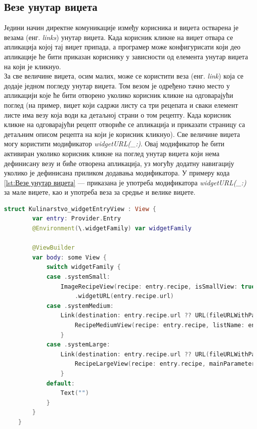 \documentclass[12pt,oneside]{memoir}
\begin{document}
\subsection{Везе унутар виџета}
\indent Једини начин директне комуникације између корисника и виџета остварена је везама (енг. \textit{links}) унутар виџета. Када корисник кликне на виџет отвара се апликација којој тај виџет припада, а програмер може конфигурисати који део апликације ће бити приказан кориснику у зависности од елемента унутар виџета на који је кликнуо.
\\
\indent За све величине виџета, осим малих, може се користити веза (енг. \textit{link}) која се додаје једном погледу унутар виџета. Том везом је одређено тачно место у апликацији које ће бити отворено уколико корисник кликне на одговарајући поглед (на пример, виџет који садржи листу са три рецепата и сваки елемент листе има везу која води ка детаљној страни о том рецепту. Када корисник кликне на одговарајући рецепт отвориће се апликација и приказати страницу са детаљним описом рецепта на који је корисник кликнуо). Све величине виџета могу користити модификатор \textit{widgetURL(\_:)}. Овај модификатор ће бити активиран уколико корисник кликне на поглед унутар виџета који нема дефинисану везу и биће отворена апликација, уз могућу додатну навигацију уколико је дефинисана приликом додавања модификатора. У примеру кода \ref{lst:Везе унутар виџета} ---  приказана је употреба модификатора \textit{widgetURL(\_:)} за мале виџете, као и употреба веза за средње и велике виџете.

\begin{lstlisting}[caption=\textit{{Везе унутар виџета}}, label={lst:Везе унутар виџета}, language=Swift, frame=single]
    struct Kulinarstvo_widgetEntryView : View {
        var entry: Provider.Entry
        @Environment(\.widgetFamily) var widgetFamily
        
        @ViewBuilder
        var body: some View {
            switch widgetFamily {
            case .systemSmall:
                ImageRecipeView(recipe: entry.recipe, isSmallView: true)
                    .widgetURL(entry.recipe.url)
            case .systemMedium:
                Link(destination: entry.recipe.url ?? URL(fileURLWithPath: "")) {
                    RecipeMediumView(recipe: entry.recipe, listName: entry.parameterToShow)
                }
            case .systemLarge:
                Link(destination: entry.recipe.url ?? URL(fileURLWithPath: "")) {
                    RecipeLargeView(recipe: entry.recipe, mainParameter: entry.parameterToShow)
                }
            default:
                Text("")
            }
        }
    }
\end{lstlisting}
\end{document}
